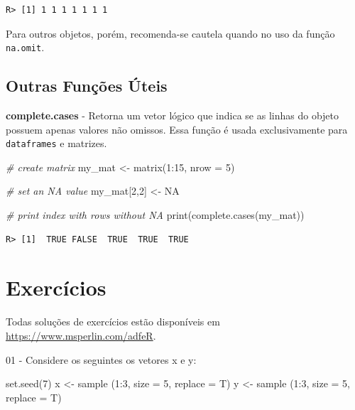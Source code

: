 \documentclass[
  11pt,
]{book}
\newenvironment{Shaded}{\begin{snugshade}}{\end{snugshade}}
\newcommand{\AttributeTok}[1]{\textcolor[rgb]{0.61,0.61,0.61}{#1}}
\newcommand{\CommentTok}[1]{\textcolor[rgb]{0.37,0.37,0.37}{\textit{#1}}}
\newcommand{\ConstantTok}[1]{\textcolor[rgb]{0,0,0}{#1}}
\newcommand{\DecValTok}[1]{\textcolor[rgb]{0.06,0.06,0.06}{#1}}
\newcommand{\FunctionTok}[1]{\textcolor[rgb]{0,0,0}{#1}}
\newcommand{\NormalTok}[1]{#1}
\newcommand{\OtherTok}[1]{\textcolor[rgb]{0.37,0.37,0.37}{#1}}
\newcommand{\SpecialCharTok}[1]{\textcolor[rgb]{0,0,0}{#1}}
\begin{document}
\begin{verbatim}
R> [1] 1 1 1 1 1 1 1
\end{verbatim}

Para outros objetos, porém, recomenda-se cautela quando no uso da função \texttt{na.omit}.

\hypertarget{outras-funuxe7uxf5es-uxfateis-6}{%
\subsection{Outras Funções Úteis}\label{outras-funuxe7uxf5es-uxfateis-6}}

\textbf{complete.cases} - Retorna um vetor lógico que indica se as linhas do objeto possuem apenas valores não omissos. Essa função é usada exclusivamente para \texttt{dataframes} e matrizes.

\begin{Shaded}
\begin{Highlighting}[]
\CommentTok{\# create matrix}
\NormalTok{my\_mat }\OtherTok{\textless{}{-}} \FunctionTok{matrix}\NormalTok{(}\DecValTok{1}\SpecialCharTok{:}\DecValTok{15}\NormalTok{, }\AttributeTok{nrow =} \DecValTok{5}\NormalTok{)}

\CommentTok{\# set an NA value}
\NormalTok{my\_mat[}\DecValTok{2}\NormalTok{,}\DecValTok{2}\NormalTok{] }\OtherTok{\textless{}{-}} \ConstantTok{NA}

\CommentTok{\# print index with rows without NA}
\FunctionTok{print}\NormalTok{(}\FunctionTok{complete.cases}\NormalTok{(my\_mat))}
\end{Highlighting}
\end{Shaded}

\begin{verbatim}
R> [1]  TRUE FALSE  TRUE  TRUE  TRUE
\end{verbatim}

\hypertarget{exerc-classes-basicas}{%
\section{Exercícios}\label{exerc-classes-basicas}}

Todas soluções de exercícios estão disponíveis em \url{https://www.msperlin.com/adfeR}.

01 -
Considere os seguintes os vetores x e y:

\begin{Shaded}
\begin{Highlighting}[]
\NormalTok{set.seed(7)}
\NormalTok{x \textless{}{-} sample (1:3, size = 5, replace = T)}
\NormalTok{y \textless{}{-} sample (1:3, size = 5, replace = T)}
\end{Highlighting}
\end{Shaded}
\end{document}

